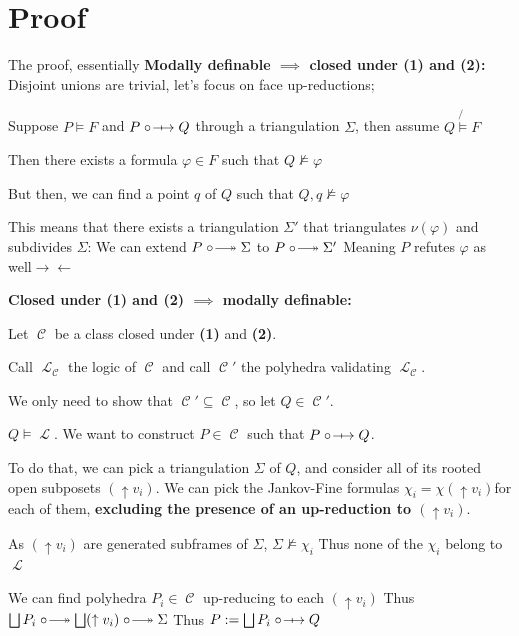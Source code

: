 \documentclass{beamer}
\DeclareMathOperator{\Ll}{\mathcal{L}}
\DeclareMathOperator{\Cc}{\mathcal{C}}
\newcommand{\upred}{
  \mathrel{\circ}~\kern-0.6em~\relbar\joinrel\twoheadrightarrow
}
\newcommand{\fupred}{
  \mathrel{\circ}~\kern-0.6em~\relbar\joinrel\mapsto
}
\begin{document}
\section{Proof}
\begin{frame}{The proof, essentially}
    \textbf{Modally definable $\implies$ closed under (1) and (2):}
    Disjoint unions are trivial, let's focus on face up-reductions;

    Suppose $P\models F$ and $P\fupred Q$ through a triangulation $\Sigma$, then assume $Q\not{\models}F$
    
    Then there exists a formula $\varphi\in F$ such that $Q\not\models \varphi$

    But then, we can find a point $q$ of $Q$ such that $Q,q\not\models\varphi$
    \vfill 
\end{frame}
\begin{frame}
    This means that there exists a triangulation $\Sigma'$ that triangulates $\nu(\varphi)$
    and subdivides $\Sigma$:
    We can extend $P\upred\Sigma$ to $P\upred\Sigma'$
    \vfill
    \vfill
    Meaning $P$ refutes $\varphi$ as well\hfill $\to\gets$
\end{frame}
\begin{frame}
    \textbf{Closed under (1) and (2) $\implies$ modally definable:}

    Let $\Cc$ be a class closed under \textbf{(1)} and \textbf{(2)}.

    Call $\Ll_{\Cc}$ the logic of $\Cc$ and call $\Cc'$ the polyhedra validating $\Ll_{\Cc}$.

    \vfill 

    We only need to show that $\Cc'\subseteq \Cc$, so let $Q\in \Cc'$.
\end{frame}
\begin{frame}
    $Q\models \Ll$.  We want to construct $P\in \Cc$ such that $P\fupred Q$.

    To do that, we can pick a triangulation $\Sigma$ of $Q$, and consider all of its rooted
    open subposets $(\uparrow v_i)$.
    \vfill
    We can pick the Jankov-Fine formulas $\chi_i=\chi(\uparrow v_i)$for each of them, \textbf{excluding
    the presence of an up-reduction to $(\uparrow v_i)$}.
\end{frame}
\begin{frame}
    As $(\uparrow v_i)$ are generated subframes of $\Sigma$, $\Sigma\not\models\chi_i$
    Thus none of the $\chi_i$ belong to $\Ll$

    We can find polyhedra $P_i\in\Cc$ up-reducing to each $(\uparrow v_i)$
    \vfill
    Thus $\bigsqcup P_i\upred \bigsqcup(\uparrow v_i)\upred \Sigma$
    \vfill
    Thus $P:=\bigsqcup P_i\fupred Q$
\end{frame}
\end{document}
